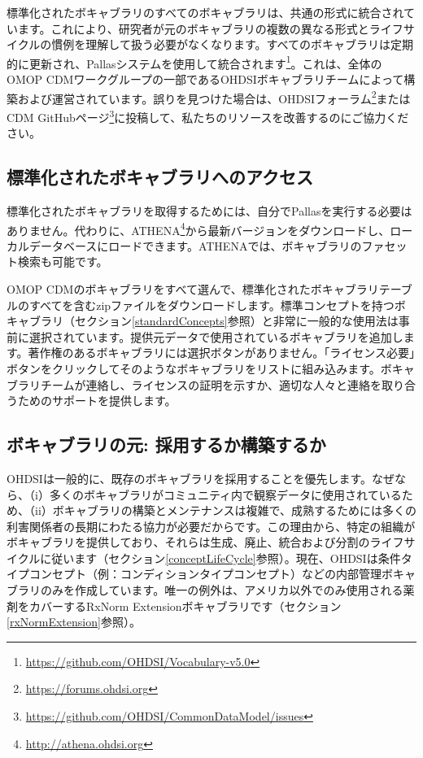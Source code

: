 \documentclass[
  11pt]{book}
\theoremstyle{definition}
\theoremstyle{definition}
\theoremstyle{definition}
\theoremstyle{definition}
\theoremstyle{remark}
\begin{document}
標準化されたボキャブラリのすべてのボキャブラリは、共通の形式に統合されています。これにより、研究者が元のボキャブラリの複数の異なる形式とライフサイクルの慣例を理解して扱う必要がなくなります。すべてのボキャブラリは定期的に更新され、Pallasシステムを使用して統合されます\footnote{\url{https://github.com/OHDSI/Vocabulary-v5.0}}。これは、全体のOMOP CDMワークグループの一部であるOHDSIボキャブラリチームによって構築および運営されています。誤りを見つけた場合は、OHDSIフォーラム\footnote{\url{https://forums.ohdsi.org}}またはCDM GitHubページ\footnote{\url{https://github.com/OHDSI/CommonDataModel/issues}}に投稿して、私たちのリソースを改善するのにご協力ください。 

\subsection{標準化されたボキャブラリへのアクセス}\label{accessVocabularies}

標準化されたボキャブラリを取得するためには、自分でPallasを実行する必要はありません。代わりに、ATHENA\footnote{\url{http://athena.ohdsi.org}}から最新バージョンをダウンロードし、ローカルデータベースにロードできます。ATHENAでは、ボキャブラリのファセット検索も可能です。   

OMOP CDMのボキャブラリをすべて選んで、標準化されたボキャブラリテーブルのすべてを含むzipファイルをダウンロードします。標準コンセプトを持つボキャブラリ（セクション\ref{standardConcepts}参照）と非常に一般的な使用法は事前に選択されています。提供元データで使用されているボキャブラリを追加します。著作権のあるボキャブラリには選択ボタンがありません。「ライセンス必要」ボタンをクリックしてそのようなボキャブラリをリストに組み込みます。ボキャブラリチームが連絡し、ライセンスの証明を示すか、適切な人々と連絡を取り合うためのサポートを提供します。

\subsection{ボキャブラリの元: 採用するか構築するか}\label{ux30dcux30adux30e3ux30d6ux30e9ux30eaux306eux5143-ux63a1ux7528ux3059ux308bux304bux69cbux7bc9ux3059ux308bux304b}

OHDSIは一般的に、既存のボキャブラリを採用することを優先します。なぜなら、（i）多くのボキャブラリがコミュニティ内で観察データに使用されているため、（ii）ボキャブラリの構築とメンテナンスは複雑で、成熟するためには多くの利害関係者の長期にわたる協力が必要だからです。この理由から、特定の組織がボキャブラリを提供しており、それらは生成、廃止、統合および分割のライフサイクルに従います（セクション\ref{conceptLifeCycle}参照）。現在、OHDSIは条件タイプコンセプト（例：コンディションタイプコンセプト）などの内部管理ボキャブラリのみを作成しています。唯一の例外は、アメリカ以外でのみ使用される薬剤をカバーするRxNorm Extensionボキャブラリです（セクション\ref{rxNormExtension}参照）。
\end{document}
